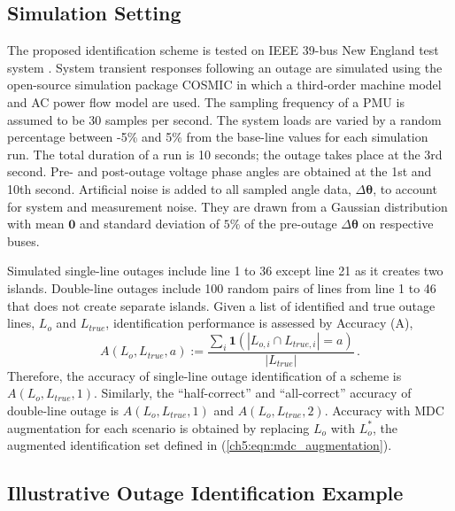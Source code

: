 \subsection{Simulation Setting}
The proposed identification scheme is tested on IEEE 39-bus New England test system \cite{athay1979practical}. System transient responses following an outage are simulated using the open-source simulation package COSMIC \cite{Song2016} in which a third-order machine model and AC power flow model are used. The sampling frequency of a PMU is assumed to be 30 samples per second. The system loads are varied by a random percentage between -5\% and 5\% from the base-line values for each simulation run. The total duration of a run is 10 seconds; the outage takes place at the 3rd second. Pre- and post-outage voltage phase angles are obtained at the 1st and 10th second. Artificial noise is added to all sampled angle data, $\Delta \boldsymbol{\theta}$, to account for system and measurement noise. They are drawn from a Gaussian distribution with mean $\mathbf{0}$ and standard deviation of $5\%$ of the pre-outage $\Delta\boldsymbol{\theta}$ on respective buses. 

Simulated single-line outages include line 1 to 36 except line 21 as it creates two islands. Double-line outages include 100 random pairs of lines from line 1 to 46 that does not create separate islands. Given a list of identified and true outage lines, $L_o$ and $L_{true}$, identification performance is assessed by Accuracy (A), 
\begin{equation}
\label{ch5:eqn:accuracy}
A(L_o, L_{true}, a):=\frac{\sum_i \mathbf{1}(\left| L_{o,i} \cap L_{true, i} \right| = a)}{\left| L_{true} \right|} \,.
\end{equation}
Therefore, the accuracy of single-line outage identification of a scheme is $A(L_o, L_{true}, 1)$. Similarly, the ``half-correct'' and ``all-correct'' accuracy of double-line outage is $A(L_o, L_{true}, 1)$ and $A(L_o, L_{true}, 2)$. Accuracy with MDC augmentation for each scenario is obtained by replacing $L_o$ with $L_o^*$, the augmented identification set defined in (\ref{ch5:eqn:mdc_augmentation}). 


\subsection{Illustrative Outage Identification Example}  

